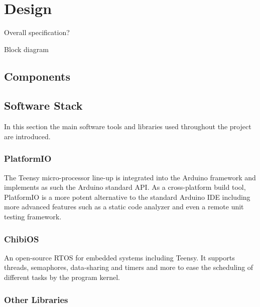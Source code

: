 \documentclass[conference]{IEEEtran}
\begin{document}
\section{Design}
Overall specification?

Block diagram

\subsection{Components}

\subsection{Software Stack}

In this section the main software tools and libraries used throughout the project are introduced.

\subsubsection{PlatformIO}
The Teensy micro-processor line-up is integrated into the Arduino framework and implements as such the Arduino standard API. As a cross-platform build tool, PlatformIO is a more potent alternative to the standard Arduino IDE including more advanced features such as a static code analyzer and even a remote unit testing framework.

\subsubsection{ChibiOS}
An open-source RTOS for embedded systems including Teensy. It supports threads, semaphores, data-sharing and timers and more to ease the scheduling of different tasks by the program kernel. 

\subsubsection{Other Libraries}
\end{document}
